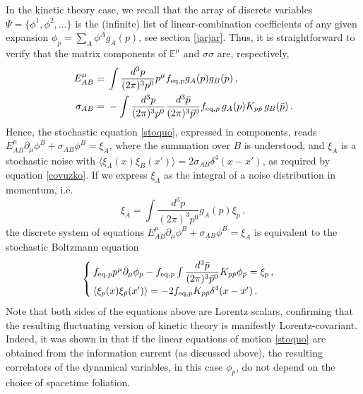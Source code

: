 \documentclass[aps,prd,preprint,nofootinbib,amsmath,amssymb,showpacs,longbibliography,singlecolumn,superscriptaddress,10pt]{revtex4-1}
\theoremstyle{plain}
\theoremstyle{definition}
\begin{document}
In the kinetic theory case, we recall that the array of discrete variables $\Psi=\{\phi^1,\phi^2,... \}$ is the (infinite) list of linear-combination coefficients of any given expansion $\phi_p=\sum_A \phi^A g_A(p)$, see section \ref{jarjar}. Thus, it is straightforward to verify that the matrix components of $\mathbb{E}^\mu$ and $\sigma \! \! \! \sigma$ are, respectively,
\begin{equation}
\begin{split}
E^\mu_{AB}={}& \int \dfrac{d^3 p}{(2\pi)^3 p^0} p^\mu f_{\text{eq},p} g_A(p)g_B(p)   \, , \\
\sigma_{AB}={}& -\int \dfrac{d^3 p}{(2\pi)^3 p^0} \dfrac{d^3 \Bar{p}}{(2\pi)^3 \Bar{p}^0} f_{\text{eq},p} \, g_A(p) K_{p\Bar{p}} \, g_B(\Bar{p}) \, .
\end{split}
\end{equation}
Hence, the stochastic equation \eqref{stoquo}, expressed in components, reads $E^\mu_{AB} \partial_\mu \phi^B {+}\sigma_{AB}\phi^B = \xi_A$, where the summation over $B$ is understood, and $\xi_A$ is a stochastic noise with $\langle \xi_A(x)\xi_B(x')\rangle = 2\sigma_{AB}\delta^4(x{-}x')$, as required by equation \eqref{covuzko}. If we express $\xi_A$ as the integral of a noise distribution in momentum, i.e.
\begin{equation}
    \xi_A = \int \dfrac{d^3 p}{(2\pi)^3 p^0} g_A(p) \xi_p \, ,
\end{equation}
the discrete system of equations $E^\mu_{AB} \partial_\mu \phi^B {+}\sigma_{AB}\phi^B = \xi_A$ is equivalent to the stochastic Boltzmann equation
\begin{equation}\label{sprintone}
\begin{cases}
 f_{\text{eq},p}p^\mu \partial_\mu \phi_p - f_{\text{eq},p} \int \dfrac{d^3 \Bar{p}}{(2\pi)^3 \Bar{p}^0} K_{p\Bar{p}} \phi_{\Bar{p}} = \xi_p \, , \\  
 \langle \xi_p(x)\xi_{\Bar{p}}(x')\rangle = -2f_{\text{eq},p}K_{p\Bar{p}} \delta^4(x-x') \, .\\
\end{cases}
\end{equation}
Note that both sides of the equations above are Lorentz scalars, confirming that the resulting fluctuating version of kinetic theory is manifestly Lorentz-covariant. Indeed, it was shown in \cite{Mullins:2023tjg} that if the linear equations of motion \eqref{stoquo} are obtained from the information current (as discussed above), the resulting correlators of the dynamical variables, in this case $\phi_p$, do not depend on the choice of spacetime foliation.
\end{document}
